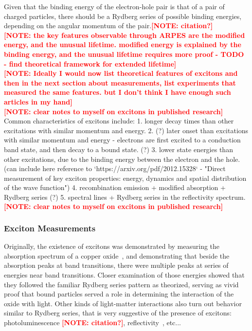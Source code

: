 \documentclass{article}
\newcommand{\note}[1]{\textbf{\textcolor{red}{[NOTE: #1]}}}
\begin{document}
Given that the binding energy of the electron-hole pair is that of a pair of charged particles, there should be a Rydberg series of possible binding energies, depending on the angular momentum of the pair.\note{citation?}\\
\note{the key features observable through ARPES are the modified energy, and the unusual lifetime. modified energy is explained by the binding energy, and the unusual lifetime requires more proof - TODO - find theoretical framework for extended lifetime}\\
\note{Ideally I would now list theoretical features of excitons and then in the next section about measurements, list experiments that measured the same features. but I don't think I have enough such articles in my hand}\\
\note{clear notes to  myself on excitons in published research}\\
Common characteristics of excitons include:
1. longer decay times than other excitations with similar momentum and energy.
2. (?) later onset than excitations with similar momentum and energy - electrons are first excited to a conduction band state, and then decay to a bound state. (?)
3. lower state energies than other excitations, due to the binding energy between the electron and the hole. (can include here reference to `https://arxiv.org/pdf/2012.15328` - "Direct measurement of key exciton properties: energy, dynamics and spatial distribution of the wave function")
4. recombination emission + modified absorption + Rydberg series (?)
5. spectral lines + Rydberg series in the reflectivity spectrum.
\\
\note{clear notes to  myself on excitons in published research}

\subsubsection{Exciton Measurements}
Originally, the existence of excitons was demonstrated by measuring the absorption spectrum of a copper oxide~\cite{gross1952optical}, and demonstrating that beside the absorption peaks at band transitions, there were multiple peaks at series of energies near band transitions.
Closer examination of those energies showed that they followed the familiar Rydberg series pattern as theorized, serving as vivid proof that bound particles served a role in determining the interaction of the oxide with light.
Other kinds of light-matter interactions also turn out behavior similar to Rydberg series, that is very suggestive of the presence of excitons: photoluminescence \note{citation?}, reflectivity~\cite{chernikov2014exciton}, etc...\\
\end{document}
